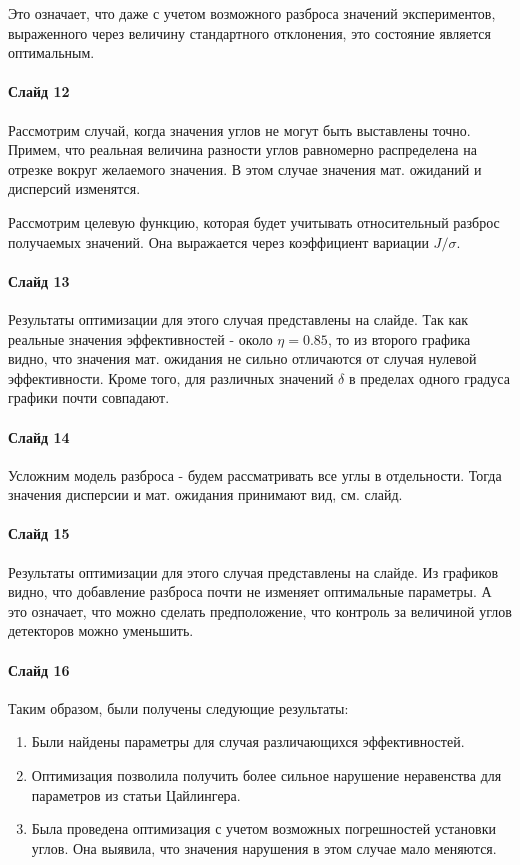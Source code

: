 \documentclass[11pt]{article}
\begin{document}
Это означает, что даже с учетом возможного разброса значений экспериментов, выраженного через величину стандартного отклонения, это состояние является оптимальным.

\paragraph{Слайд 12}
Рассмотрим случай, когда значения углов не могут быть выставлены точно. Примем, что реальная величина разности углов равномерно распределена на отрезке вокруг желаемого значения. В этом случае значения мат. ожиданий и дисперсий изменятся.

Рассмотрим целевую функцию, которая будет учитывать относительный разброс получаемых значений. Она выражается через коэффициент вариации $J / \sigma$.

\paragraph{Слайд 13}
Результаты оптимизации для этого случая представлены на слайде. Так как реальные значения эффективностей - около $\eta = 0.85$, то из второго графика видно, что значения мат. ожидания не сильно отличаются от случая нулевой эффективности. Кроме того, для различных значений $\delta$ в пределах одного градуса графики почти совпадают.

\paragraph{Слайд 14}
Усложним модель разброса - будем рассматривать все углы в отдельности. Тогда значения дисперсии и мат. ожидания принимают вид, см. слайд.

\paragraph{Слайд 15}
Результаты оптимизации для этого случая представлены на слайде. Из графиков видно, что добавление разброса почти не изменяет оптимальные параметры. А это означает, что можно сделать предположение, что контроль за величиной углов детекторов можно уменьшить.

\paragraph{Слайд 16}
Таким образом, были получены следующие результаты:
\begin{enumerate}
\item Были найдены параметры для случая различающихся эффективностей.
\item Оптимизация позволила получить более сильное нарушение неравенства для параметров из статьи Цайлингера.
\item Была проведена оптимизация с учетом возможных погрешностей установки углов. Она выявила, что значения нарушения в этом случае мало меняются.
\end{enumerate}
\end{document}
